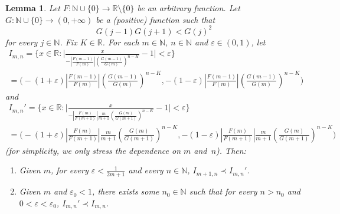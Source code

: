 \documentclass[10pt, a4paper, leqno]{amsart}
\numberwithin{equation}{section}
\theoremstyle{plain}
\newtheorem{Lem}[Theo]{Lemma}
\theoremstyle{remark}
\newcommand{\RR}{\mathbb{R}}
\newcommand{\NN}{\mathbb{N}}
\newcommand{\eps}{\varepsilon}
\begin{document}
\begin{Lem}
\label{lemaImn}
Let $F : \NN \cup \{0\} \to \RR \setminus \{0\}$ be an arbitrary function.
Let $G : \NN \cup \{0\} \to (0,+\infty)$ be a (positive) function such that
\[
  G(j-1) G(j+1) < G(j)^2
\]
for every $j \in \NN$.  Fix $K \in \RR$. For each $m \in \NN$, $n \in \NN$ and $\eps \in (0,1)$, let
\begin{multline}
  I_{m,n}
  = \Bigg\{ x \in \RR : \Bigg| \frac{x}{-\left|\frac{F(m-1)}{F(m)}\right| 
  \left(\frac{G(m-1)}{G(m)}\right)^{n-K}} - 1 \Bigg| < \eps
  \Bigg\}
  \\
  = \biggl(
  -(1+\eps) \left|\tfrac{F(m-1)}{F(m)}\right| \left(\tfrac{G(m-1)}{G(m)}\right)^{n-K},
  -(1-\eps) \left|\tfrac{F(m-1)}{F(m)}\right| \left(\tfrac{G(m-1)}{G(m)}\right)^{n-K}
  \biggr)
\label{Imn}
\end{multline}
and
\begin{multline}
  I_{m,n}'
  = \Bigg\{ x \in \RR : \Bigg|
  \frac{x}{-\left|\tfrac{F(m)}{F(m+1)}\right| \tfrac{m}{m+1} \left(
  \frac{G(m)}{G(m+1)}
  \right)^{n-K}}
  -1
  \Bigg| < \eps
  \Bigg\}
  \\
  = \biggl(
  -(1+\eps) \left|\tfrac{F(m)}{F(m+1)}\right| \tfrac{m}{m+1} \left(
  \tfrac{G(m)}{G(m+1)}
  \right)^{n-K},
  -(1-\eps) \left|\tfrac{F(m)}{F(m+1)}\right| \tfrac{m}{m+1} \left(
  \tfrac{G(m)}{G(m+1)}
  \right)^{n-K}
  \biggr)
\label{Imn'}
\end{multline}
(for simplicity, we only stress the dependence on $m$ and~$n$).
Then:
\begin{enumerate}
\item
\label{lemaImn-1}
Given $m$, for every $\eps < \frac{1}{2m+1}$ and every $n \in \NN$, $I_{m+1,n} \prec I_{m,n}'$.
\item
\label{lemaImn-2}
Given $m$ and $\eps_0 < 1$, there exists some $n_0 \in \NN$ such that for every $n > n_0$ and $0 < \eps < \eps_0$, $I_{m,n}' \prec I_{m,n}$.
\end{enumerate}
\end{Lem}
\end{document}
